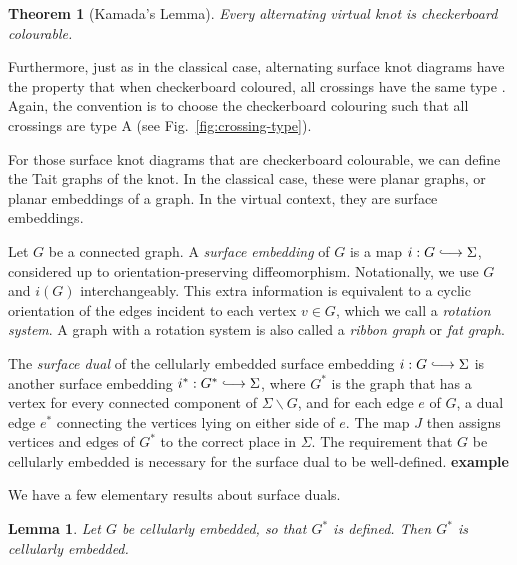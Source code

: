 \documentclass[12pt]{report}
\newcommand{\inject}{\lhook\joinrel\longrightarrow}
\newcommand{\notered}[1]{{\color{Red} \textbf{#1}}}
\newtheorem*{theorem}{Theorem}
\newtheorem*{lemma}{Lemma}
\begin{document}
\begin{theorem}[Kamada's Lemma]
	Every alternating virtual knot is checkerboard colourable.
\end{theorem}

Furthermore, just as in the classical case, alternating surface knot diagrams have the property that when checkerboard coloured, all crossings have the same type \cite[Lemma 6]{alternating-links-thickened-surfaces}. Again, the convention is to choose the checkerboard colouring such that all crossings are type A (see Fig.~\ref{fig:crossing-type}).

For those surface knot diagrams that are checkerboard colourable, we can define the Tait graphs of the knot. In the classical case, these were planar graphs, or planar embeddings of a graph. In the virtual context, they are surface embeddings.

Let $G$ be a connected graph. A \textit{surface embedding} of $G$ is a map $i: G \inject \Sigma$, considered up to orientation-preserving diffeomorphism. Notationally, we use $G$ and $i(G)$ interchangeably. This extra information is equivalent to a cyclic orientation of the edges incident to each vertex $v \in G$, which we call a \textit{rotation system}. A graph with a rotation system is also called a \textit{ribbon graph} or \textit{fat graph}.

The \textit{surface dual} of the cellularly embedded surface embedding $i: G \inject \Sigma$ is another surface embedding $i^{*}: G^{*} \inject \Sigma$, where $G^{*}$ is the graph that has a vertex for every connected component of  $\Sigma \smallsetminus G$, and for each edge $e$ of $G$, a dual edge $e^{\ast}$ connecting the vertices lying on either side of $e$. The map $J$ then assigns vertices and edges of $G^{*}$ to the correct place in $\Sigma$. The requirement that $G$ be cellularly embedded is necessary for the surface dual to be well-defined. \notered{example}

We have a few elementary results about surface duals.

\begin{lemma}
Let $G$ be cellularly embedded, so that $G^{*}$ is defined. Then $G^{*}$ is cellularly embedded.
\end{lemma}
\end{document}

